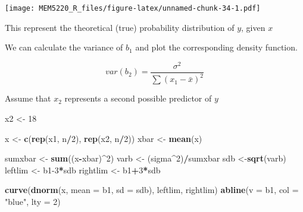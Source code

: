\documentclass[]{book}
\newenvironment{Shaded}{\begin{snugshade}}{\end{snugshade}}
\newcommand{\DataTypeTok}[1]{\textcolor[rgb]{0.13,0.29,0.53}{#1}}
\newcommand{\DecValTok}[1]{\textcolor[rgb]{0.00,0.00,0.81}{#1}}
\newcommand{\KeywordTok}[1]{\textcolor[rgb]{0.13,0.29,0.53}{\textbf{#1}}}
\newcommand{\NormalTok}[1]{#1}
\newcommand{\OperatorTok}[1]{\textcolor[rgb]{0.81,0.36,0.00}{\textbf{#1}}}
\newcommand{\StringTok}[1]{\textcolor[rgb]{0.31,0.60,0.02}{#1}}
\begin{document}
\texttt{[image: MEM5220\_R\_files/figure-latex/unnamed-chunk-34-1.pdf]}

This represent the theoretical (true) probability distribution of \(y\),
given \(x\)

We can calculate the variance of \(b_{1}\) and plot the corresponding
density function.

\begin{equation}
var(b_2) = \frac{\sigma^2}{\sum{}{}(x_1 - \bar{x})^2}
\label{eq:variancebeta}
\end{equation}

Assume that \(x_{2}\) represents a second possible predictor of \(y\)

\begin{Shaded}
\begin{Highlighting}[]
\NormalTok{x2 <-}\StringTok{ }\DecValTok{18}

\NormalTok{x <-}\StringTok{ }\KeywordTok{c}\NormalTok{(}\KeywordTok{rep}\NormalTok{(x1, n}\OperatorTok{/}\DecValTok{2}\NormalTok{), }\KeywordTok{rep}\NormalTok{(x2, n}\OperatorTok{/}\DecValTok{2}\NormalTok{))}
\NormalTok{xbar <-}\StringTok{ }\KeywordTok{mean}\NormalTok{(x)}

\NormalTok{sumxbar <-}\StringTok{ }\KeywordTok{sum}\NormalTok{((x}\OperatorTok{-}\NormalTok{xbar)}\OperatorTok{^}\DecValTok{2}\NormalTok{)}
\NormalTok{varb <-}\StringTok{ }\NormalTok{(sigma}\OperatorTok{^}\DecValTok{2}\NormalTok{)}\OperatorTok{/}\NormalTok{sumxbar}
\NormalTok{sdb <-}\KeywordTok{sqrt}\NormalTok{(varb)}
\NormalTok{leftlim <-}\StringTok{ }\NormalTok{b1}\DecValTok{-3}\OperatorTok{*}\NormalTok{sdb}
\NormalTok{rightlim <-}\StringTok{ }\NormalTok{b1}\OperatorTok{+}\DecValTok{3}\OperatorTok{*}\NormalTok{sdb}
\end{Highlighting}
\end{Shaded}

\begin{Shaded}
\begin{Highlighting}[]
\KeywordTok{curve}\NormalTok{(}\KeywordTok{dnorm}\NormalTok{(x, }\DataTypeTok{mean =}\NormalTok{ b1, }\DataTypeTok{sd =}\NormalTok{ sdb), leftlim, rightlim)}
\KeywordTok{abline}\NormalTok{(}\DataTypeTok{v =}\NormalTok{ b1, }\DataTypeTok{col =} \StringTok{"blue"}\NormalTok{, }\DataTypeTok{lty =} \DecValTok{2}\NormalTok{)}
\end{Highlighting}
\end{Shaded}
\end{document}
